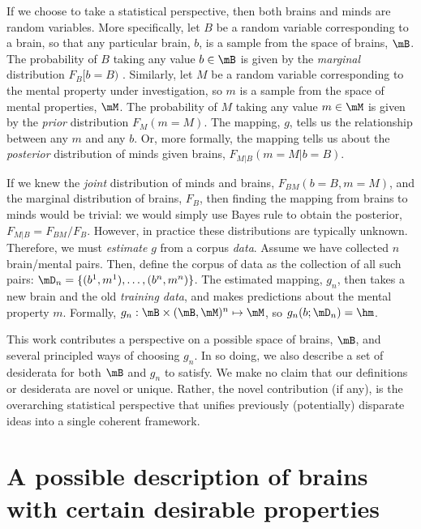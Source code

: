 If we choose to take a statistical perspective, then both brains and minds are random variables. More specifically, let $B$ be a random variable corresponding to a brain, so that any particular brain, $b$, is a sample from the space of brains, $\mB$. The probability of $B$ taking any value $b \in \mB$ is given by the \emph{marginal} distribution $F_B[b = B)$%
. Similarly, let $M$ be a random variable corresponding to the mental property under investigation, so $m$ is a sample from the space of mental properties, $\mM$. The probability of $M$ taking any value $m \in \mM$ is given by the \emph{prior} distribution $F_M(m = M)$. The mapping, $g$, tells us the relationship between any $m$ and any $b$. Or, more formally, the mapping tells us about the \emph{posterior} distribution of minds given brains, $F_{M|B}(m=M | b=B)$. 

If we knew the \emph{joint} distribution of minds and brains, $F_{BM}(b=B,m=M)$, and the marginal distribution of brains, $F_B$, then finding the mapping from brains to minds would be trivial: we would simply use Bayes rule to obtain the posterior, $F_{M|B} = F_{BM}/F_B$. However, in practice these distributions are typically unknown. Therefore, we must \emph{estimate} $g$ from a corpus \emph{data}. Assume we have collected $n$ brain/mental pairs. Then, define the corpus of data as the collection of all such pairs: $\mD_n=\{(b^1,m^1), \ldots, (b^n,m^n)\}$. The estimated mapping, $g_n$, then takes a new brain and the old \emph{training data}, and makes predictions about the mental property $m$. Formally, $g_n: \mB \times (\mB, \mM)^n \mapsto \mM$, so $g_n(b; \mD_n)=\hm$.

This work contributes a perspective on a possible space of brains, $\mB$, and several principled ways of choosing $g_n$. In so doing, we also describe a set of desiderata for both $\mB$ and $g_n$ to satisfy. We make no claim that our definitions or desiderata are novel or unique. Rather, the novel contribution (if any), is the overarching statistical perspective that unifies previously (potentially) disparate ideas into a single coherent framework.

\section{A possible description of brains with certain desirable properties} 

\label{sec:B}

